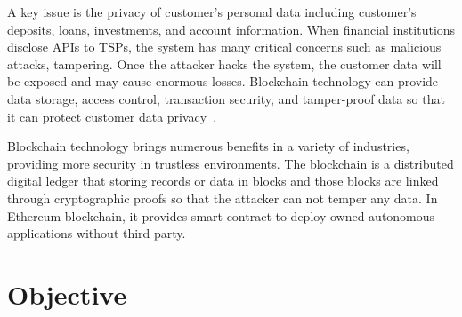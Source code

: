 A key issue is the privacy of customer's personal data including customer's deposits, loans, investments, and account information. When financial institutions disclose APIs to TSPs, the system has many critical concerns such as malicious attacks, tampering. Once the attacker hacks the system, the customer data will be exposed and may cause enormous losses. Blockchain technology can provide data storage, access control, transaction security, and tamper-proof data so that it can protect customer data privacy~\cite{wang2020blockchain}.\par
Blockchain technology brings numerous benefits in a variety of industries, providing more security in trustless environments. The blockchain is a distributed digital ledger that storing records or data in blocks and those blocks are linked through cryptographic proofs so that the attacker can not temper any data. In Ethereum blockchain, it provides smart contract to deploy owned autonomous applications without third party.

\section{Objective}